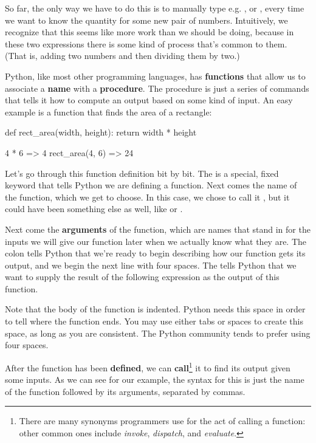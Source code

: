 \documentclass{article}
\newcommand\pyi\pythoninline
\begin{document}
So far, the only way we have to do this is to manually type e.g. \pyi{(3 + 2)/2}, or \pyi{(7 + 10)/2}, every time we want to know the quantity for some new pair of numbers. Intuitively, we recognize that this seems like more work than we should be doing, because in these two expressions there is some kind of process that's common to them. (That is, adding two numbers and then dividing them by two.)

Python, like most other programming languages, has \textbf{functions} that allow us to associate a \textbf{name} with a \textbf{procedure}. The procedure is just a series of commands that tells it how to compute an output based on some kind of input. An easy example is a function that finds the area of a rectangle:

\begin{python}
def rect_area(width, height):
    return width * height

4 * 6
=> 4
rect_area(4, 6)
=> 24
\end{python}

Let's go through this function definition bit by bit. The \pyi{def} is a special, fixed keyword that tells Python we are defining a function. Next comes the name of the function, which we get to choose. In this case, we chose to call it \pyi{rect_area}, but it could have been something else as well, like \pyi{area} or \pyi{rectangle_area}. 

Next come the \textbf{arguments} of the function, which are names that stand in for the inputs we will give our function later when we actually know what they are. The colon tells Python that we're ready to begin describing how our function gets its output, and we begin the next line with four spaces. The \pyi{return} tells Python that we want to supply the result of the following expression as the output of this function.

Note that the body of the function is indented. Python needs this space in order to tell where the function ends. You may use either tabs or spaces to create this space, as long as you are consistent. The Python community tends to prefer using four spaces.

After the function has been \textbf{defined}, we can \textbf{call}\footnote{There are many synonyms programmers use for the act of calling a function: other common ones include \emph{invoke}, \emph{dispatch}, and \emph{evaluate}.} it to find its output given some inputs. As we can see for our example, the syntax for this is just the name of the function followed by its arguments, separated by commas.
\end{document}
